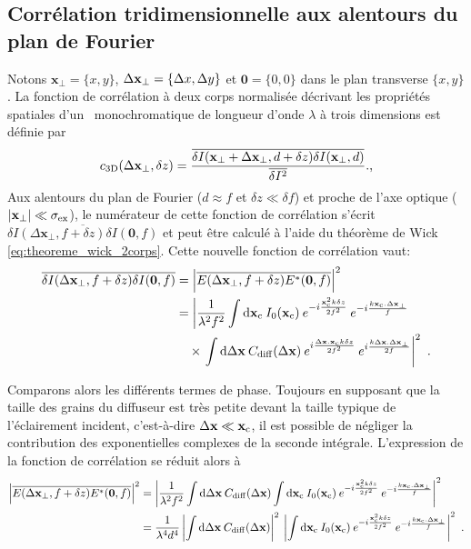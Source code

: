 \subsection{Corrélation tridimensionnelle aux alentours du plan de Fourier}
Notons $\mathbf{x}_{\perp}=\lbrace x,y\rbrace$, $\Delta\mathbf{x}_{\perp}=\lbrace \Delta x, \Delta y\rbrace$ et $\mathbf{0}=\lbrace 0,0 \rbrace$ dans le plan transverse $\lbrace x,y \rbrace$. La fonction de corrélation à deux corps normalisée décrivant les propriétés spatiales d'un \speckle\ monochromatique de longueur d'onde $\lambda$ à trois dimensions est définie par 
\begin{equation}
c_{\mathrm{3D}}(\Delta\mathbf{x}_{\perp},\delta z)=\frac{\overline{\delta I(\mathbf{x}_{\perp} + \Delta\mathbf{x}_{\perp}, d+\delta z) \delta I(\mathbf{x}_{\perp}, d)}}{\overline{\delta I^2}} \text{.,}
\end{equation}
Aux alentours du plan de Fourier ($d\approx f$ et $\delta z \ll \delta f$) et proche de l'axe optique ($|\mathbf{x}_{\perp}|\ll \sigma_{\mathrm{ex}}$), le numérateur de cette fonction de corrélation s'écrit $\overline{\delta I(\Delta\mathbf{x}_{\perp},f+\delta z) \delta I(\mathbf{0}, f)}$ et peut être calculé à l'aide du théorème de Wick \ref{eq:theoreme_wick_2corps}. Cette nouvelle fonction de corrélation vaut:
\begin{align}
\overline{\delta I (\Delta\mathbf{x}_{\perp}, f+\delta z) \delta I(\mathbf{0},f)} &= \left| \overline{E(\Delta\mathbf{x}_{\perp},f+\delta z)E^*(\mathbf{0},f)} \right|^2 \\
&= \left| \frac{1}{\lambda^2 f^2} \int{\mathop{}\mathopen{}\mathrm{d}\mathbf{x}_{\mathrm{c}}\: I_0(\mathbf{x}_{\mathrm{c}}) \: e^{-i\frac{\mathbf{x}_{\mathrm{c}}^2 k \delta z}{2f^2}} \: e^{-i\frac{k \mathbf{x}_{\mathrm{c}}. \Delta\mathbf{x}_{\perp}}{f}}}\right. \\
&\nonumber \quad\times \left.\int{\mathop{}\mathopen{}\mathrm{d}\Delta\mathbf{x}\: C_{\mathrm{diff}}(\Delta\mathbf{x}) \: e^{i\frac{\Delta\mathbf{x}. \mathbf{x}_{\mathrm{c}}k \delta z}{2 f^2}} \: e^{i\frac{k\Delta\mathbf{x}. \Delta\mathbf{x}_{\perp}}{2f}}} \right|^2 \text{ .}
\end{align}

Comparons alors les différents termes de phase. Toujours en supposant que la taille des grains du diffuseur est très petite devant la taille typique de l'éclairement incident, c'est-à-dire $\Delta\mathbf{x} \ll \mathbf{x}_{\mathrm{c}}$, il est possible de négliger la contribution des exponentielles complexes de la seconde intégrale. L'expression de la fonction de corrélation se réduit alors à
\begin{align}
{\left| \overline{E(\Delta\mathbf{x}_{\perp},f+\delta z)E^*(\mathbf{0},f)}\right|}^2 &= {\left| \frac{1}{\lambda^2 f^2}  \int{\mathop{}\mathopen{}\mathrm{d}\Delta\mathbf{x}\: C_{\mathrm{diff}}(\Delta\mathbf{x})} \int{\mathop{}\mathopen{}\mathrm{d}\mathbf{x}_{\mathrm{c}}\: I_0(\mathbf{x}_{\mathrm{c}}) \: e^{-i\frac{\mathbf{x}_{\mathrm{c}}^2 k \delta z}{2f^2}} \: e^{-i \frac{k \mathbf{x}_{\mathrm{c}}. \Delta\mathbf{x}_{\perp}}{f}}} \right|}^2 \\
&= \frac{1}{\lambda^4 d^4} \left|\int{\mathop{}\mathopen{}\mathrm{d}\Delta\mathbf{x}\: C_{\mathrm{diff}}(\Delta\mathbf{x})}\right|^2 \: \left|\int{\mathop{}\mathopen{}\mathrm{d}\mathbf{x}_{\mathrm{c}}\: I_0(\mathbf{x}_{\mathrm{c}}) \: e^{-i\frac{\mathbf{x}_{\mathrm{c}}^2 k\delta z}{2f^2}} \: e^{-i\frac{k\mathbf{x}_{\mathrm{c}}.\Delta\mathbf{x}_{\perp}}{f}}} \right|^2 \text{ .}
\end{align}

